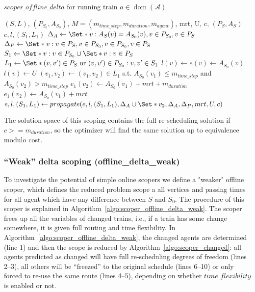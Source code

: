 \documentclass{article}
\DeclareMathOperator{\dom}{dom}
\begin{document}
\begin{algorithm}
	\caption{$scoper\_offline\_delta$ for running train $a \in \dom(\mathcal{A})$} \label{algo:scoper_offline_delta}
	\begin{algorithmic}[1]
		\Require $(S,L)$, $(P_{S_0},A_{S_0})$, $M=(m_{time\_step},m_{duration},m_{agent})$, mrt, U, c, $(P_S,A_S)$
	    \Ensure $e,l,(S_1,L_1)$
	    \State $\Delta_A \leftarrow \Set*{v: A_S(v)=A_{S_0}(v), v\in P_{S_0}, v \in P_S}$
	    \State $\Delta_P \leftarrow \Set*{v: v\in P_S, v\in P_{S_0}, v\in P_{S_0}, v \in P_S}$
	    \State $S_1 \leftarrow \Set*{v: v\in P_{S_0}} \cup \Set*{v: v\in P_{S}}$
	    \State $L_1 \leftarrow \Set*{(v,v^\prime) \in P_S \textrm{ or } (v,v^\prime) \in P_{S_0}: v,v^\prime \in S_1}$
	        \State $l(v)\leftarrow e(v)\leftarrow A_{S_0}(v)$
	    \EndFor
	        \State $l(v) \leftarrow U$
	    \EndFor
	    \State $(v_1,v_2) \leftarrow (v_1,v_2) \in L_1$ s.t. $A_{S_0}(v_1)\leq m_{time\_step}$ and $A_{S_0}(v_2)>m_{time\_step}$
            \State $e_1(v_2) \leftarrow A_{S_0}(v_1)+mrt+m_{duration}$
        \Else
            \State $e_1(v_2) \leftarrow A_{S_0}(v_1)+mrt$
        \EndIf
        \EndIf
	    \State $e,l,(S_1,L_1) \leftarrow propagate(e,l,(S_1,L_1),\Delta_A \cup \Set*{v_2}, \Delta_A, \Delta_P, mrt, U, c)$
	\end{algorithmic}
\end{algorithm}
The solution space of this scoping contains the full re-scheduling solution if $c >= m_{duration}$, so the optimizer will find the same solution up to equivalence modulo cost.



\subsubsection{``Weak'' delta scoping (offline\_delta\_weak)}\label{subsubsec:offline_delta_weak}


To investigate the potential of simple online scopers we define a "weaker" offline scoper, which defines the reduced problem scope a all vertices and passing times for all agent which have any difference between $S$ and $S_0$.
The procedure of this scoper is explained in Algorithm~\ref{algo:scoper_offline_delta_weak}. The scoper frees up all the variables of changed trains, i.e., if a train has some change somewhere, it is given full routing and time flexibility. In Algorithm~\ref{algo:scoper_offline_delta_weak}, the changed agents are determined (line 1) and then the scope is reduced by Algorithm~\ref{algo:scoper_changed}:
all agents predicted as changed will have full re-scheduling degrees of freedom (lines 2--3), all others will be ``freezed'' to the original schedule (lines 6--10) or only forced to re-use the same route (lines 4--5), depending on whether $time\_flexibility$ is enabled or not.
\end{document}
